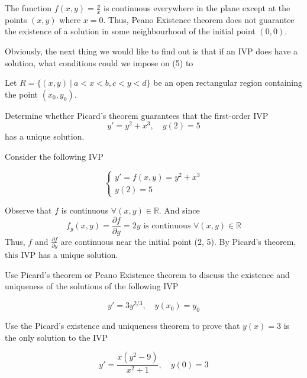 \begin{remark}
    The function $f(x,y) = \frac{y}{x}$ is continuous everywhere in the plane except
    at the points $(x, y)$ where $x=0$. Thus, Peano Existence theorem does not guarantee 
    the existence of a solution in some neighbourhood of the initial point $(0,0)$.
\end{remark}

Obviously, the next thing we would like to find out is that if an IVP does have a solution, what conditions 
could we impose on (5) to 

\begin{theorem}
    Let $R = \{(x,y) \> | \> a < x < b, c < y < d\}$ be an open rectangular region 
    containing the point $(x_0, y_0)$.

    
\end{theorem}

\begin{example}
    Determine whether Picard's theorem guarantees that the first-order IVP
    \[
        y' = y^2 + x^3, \quad y(2) = 5
    \]
    has a unique solution.
\end{example}
\begin{solution}
    Consider the following IVP

    \[
        \begin{cases}
            y' = f(x,y) = y^2 + x^3\\
            y(2) = 5
        \end{cases}
    \]

    Observe that $f$ is continuous $\forall (x,y) \in \mathbb{R}$. And since
    \[
        f_y(x, y) = \frac{\partial f}{\partial y}=2y \text{ is continuous } \forall (x,y) \in \mathbb{R}
    \]
    Thus, $f$ and $\frac{\partial f}{\partial y}$ are continuous near the initial point (2, 5). 
    By Picard's theorem, this IVP has a unique solution.
\end{solution}

\begin{example}
    Use Picard's theorem or Peano Existence theorem to discuss the existence and 
    uniqueness of the solutions of the following IVP

    \[
        y' = 3y^{2/3}, \quad y(x_0) = y_0
    \]
\end{example}

\begin{example}
    Use the Picard's existence and uniqueness theorem to prove that $y(x) = 3$ is the only 
    solution to the IVP

    \[
        y' = \frac{x(y^2 - 9)}{x^2 + 1}, \quad y(0) = 3
    \]
\end{example}

